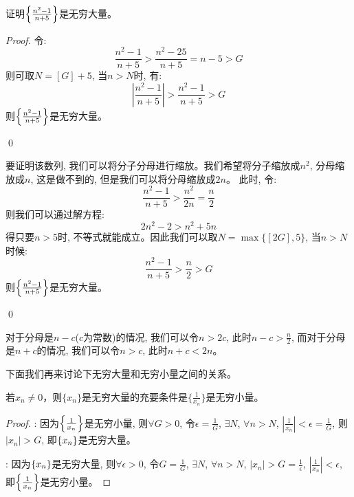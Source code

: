 \begin{example}
    证明$\left\{ \frac{n^2-1}{n+5}\right\}$是无穷大量。 
\end{example}
\begin{proof}
    令:
    \begin{equation*}
        \frac{n^2-1}{n+5} > \frac{n^2-25}{n+5} = n-5 > G 
    \end{equation*}
    则可取$N = [G] + 5$, 当$n > N$时, 有:
    \begin{equation*}
        \left| \frac{n^2-1}{n+5} \right| > \frac{n^2-1}{n+5} > G
    \end{equation*}
    则$\left\{ \frac{n^2-1}{n+5}\right\}$是无穷大量。

    \qed

    要证明该数列, 我们可以将分子分母进行缩放。我们希望将分子缩放成$n^2$, 分母缩放成$n$, 这是做不到的, 但是我们可以将分母缩放成$2n$。
    此时, 令:
    \begin{equation*}
        \frac{n^2-1}{n+5} > \frac{n^2}{2n} = \frac{n}{2}
    \end{equation*}
    则我们可以通过解方程:
    \begin{equation*}
        2n^2-2 > n^2 + 5n
    \end{equation*}
    得只要$n > 5$时, 不等式就能成立。因此我们可以取$N = \max\{[2G], 5\}$, 当$n > N$时候:
    \begin{equation*}
        \frac{n^2-1}{n+5} > \frac{n}{2} > G
    \end{equation*}
    则$\left\{ \frac{n^2-1}{n+5}\right\}$是无穷大量。

    \qed

\end{proof}
\begin{remark}
    对于分母是$n-c$($c$为常数)的情况, 我们可以令$n > 2c$, 此时$n - c > \frac{n}{2}$, 而对于分母是$n+c$的情况, 我们可以令$n > c$, 此时$n + c < 2n$。
\end{remark}

下面我们再来讨论下无穷大量和无穷小量之间的关系。
\begin{lemma}\label{lemma:inverse}
    若$x_n \neq 0$，则$\{ x_n \}$是无穷大量的充要条件是$\{ \frac{1}{x_n} \}$是无穷小量。    
\end{lemma}
\begin{proof}
    : 因为$\left\{ \frac{1}{x_n}\right\}$是无穷小量, 则$\forall G > 0$, 令$\epsilon = \frac{1}{G}$, $\exists N$, $\forall n > N$, $\left| \frac{1}{x_n}\right| < \epsilon = \frac{1}{G}$, 则$|x_n| > G$, 即$\left\{ x_n\right\}$是无穷大量。

    : 因为$\left\{ x_n\right\}$是无穷大量, 则$\forall \epsilon > 0$, 令$G = \frac{1}{G}$, $\exists N$, $\forall n > N$, $|x_n| > G = \frac{1}{\epsilon}$, $\left| \frac{1}{x_n}\right| < \epsilon$, 即$\left\{ \frac{1}{x_n}\right\}$是无穷小量。
\end{proof}

